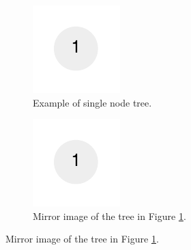 \begin{figure}
	\centering
	\begin{subfigure}[b]{0.4\textwidth}
		\includegraphics[]{sources/mirror_binary_tree/images/leaf}
		\caption{Example of single node tree.}
		\label{fig:mirro_binary_tree:leaf}
	 \end{subfigure}
	 \hfill
	 \begin{subfigure}[b]{0.4\textwidth}
		\includegraphics[]{sources/mirror_binary_tree/images/leaf}
		\caption{Mirror image of the tree in Figure \ref{fig:mirro_binary_tree:leaf}.}
		\label{fig:mirro_binary_tree:leaf_mirror}
	 \end{subfigure}
	 
	 \centering


\end{figure}
